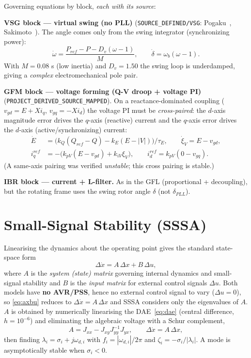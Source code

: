 \documentclass[12pt,a4paper]{article}
\begin{document}
\noindent Governing equations by block, \emph{each with its source}:

\noindent\textbf{VSG block --- virtual swing (no PLL)} (\texttt{SOURCE\_DEFINED/VSG}:
Pogaku~\cite{pogaku2007}, Sakimoto~\cite{sakimoto2015}). The angle comes only from the
swing integrator (synchronizing power):
\begin{equation}
\dot\omega = \frac{P_{ref}-P-D_v(\omega-1)}{M},\qquad
\dot\delta = \omega_b(\omega-1).
\label{eq:gfm-swing}
\end{equation}
With $M=0.08$ s (low inertia) and $D_v=1.50$ the swing loop is underdamped, giving a
\emph{complex} electromechanical pole pair.

\noindent\textbf{GFM block --- voltage forming (Q-V droop + voltage PI)}
(\texttt{PROJECT\_DERIVED\_SOURCE\_MAPPED}). On a reactance-dominated coupling
($v_{gd}=E+Xi_q$, $v_{gq}=-Xi_d$) the voltage PI must be \emph{cross-paired}: the
$d$-axis magnitude error drives the $q$-axis (reactive) current and the $q$-axis error
drives the $d$-axis (active/synchronizing) current:
\begin{align}
\dot E &= \big(k_Q(Q_{ref}-Q)-k_E(E-|V|)\big)/\tau_E,\qquad \dot\xi_{V}=E-v_{gd},\\
i_q^{ref} &= -\big(k_{pV}(E-v_{gd})+k_{iV}\xi_{V}\big),\qquad
i_d^{ref} = k_{pV}(0-v_{gq}).
\end{align}
(A same-axis pairing was verified \emph{unstable}; this cross pairing is stable.)

\noindent\textbf{IBR block --- current + L-filter.} As in the GFL (proportional +
decoupling), but the rotating frame uses the swing rotor angle $\delta$ (not
$\delta_{PLL}$).

\section{Small-Signal Stability (SSSA)}

Linearising the dynamics about the operating point gives the standard state-space form
\begin{equation}
\Delta\dot x = A\,\Delta x + B\,\Delta u,
\label{eq:axbu}
\end{equation}
where $A$ is the \emph{system (state) matrix} governing internal dynamics and
small-signal stability and $B$ is the \emph{input matrix} for external control signals
$\Delta u$. Both models have \textbf{no AVR/PSS}, hence no external control signal to
vary ($\Delta u=0$), so \eqref{eq:axbu} reduces to $\Delta\dot x = A\,\Delta x$ and SSSA
considers only the eigenvalues of $A$. $A$ is obtained by numerically linearising the
DAE~\eqref{eq:dae} (central difference, $h=10^{-6}$) and eliminating the algebraic
voltage with a Schur complement,
\begin{equation}
A = J_{xx}-J_{xy}J_{yy}^{-1}J_{yx},\qquad \Delta\dot x = A\,\Delta x,
\end{equation}
then finding $\lambda_i=\sigma_i+j\omega_{d,i}$ with $f_i=|\omega_{d,i}|/2\pi$ and
$\zeta_i=-\sigma_i/|\lambda_i|$. A mode is asymptotically stable when $\sigma_i<0$.
\end{document}
